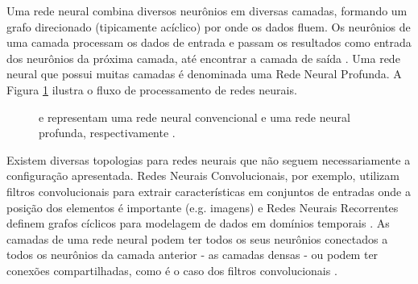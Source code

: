 Uma rede neural combina diversos neurônios em diversas camadas, formando um grafo direcionado (tipicamente acíclico) por onde os dados fluem. Os neurônios de uma camada processam os dados de entrada e passam os resultados como entrada dos neurônios da próxima camada, até encontrar a camada de saída \cite{MichaelNielsen}. Uma rede neural que possui muitas camadas é denominada uma Rede Neural Profunda. A Figura \ref{fig:neuralnetworks} ilustra o fluxo de processamento de redes neurais.

\begin{figure}[ht]
 \centering
   \qquad
   \captionsetup{width=1\textwidth}
   \caption{{} e {} representam uma rede neural convencional e uma rede neural profunda, respectivamente \cite{MichaelNielsen}.}
  \label{fig:neuralnetworks}
\end{figure}

Existem diversas topologias para redes neurais que não seguem necessariamente a configuração apresentada. Redes Neurais Convolucionais, por exemplo, utilizam filtros convolucionais para extrair características em conjuntos de entradas onde a posição dos elementos é importante (e.g. imagens) \cite{LeCun1989} e Redes Neurais Recorrentes definem grafos cíclicos para modelagem de dados em domínios temporais \cite{Rumelhart1986}. As camadas de uma rede neural podem ter todos os seus neurônios conectados a todos os neurônios da camada anterior - as camadas densas - ou podem ter conexões compartilhadas, como é o caso dos filtros convolucionais \cite{LeCun1989}.

